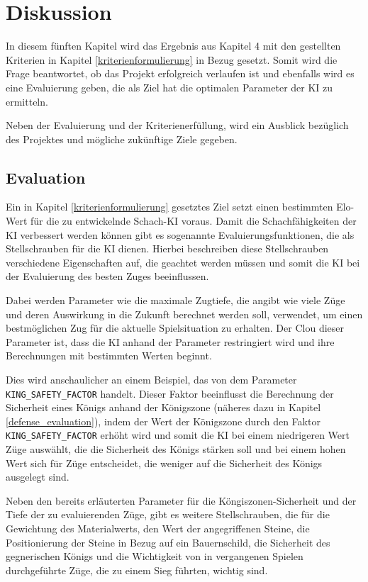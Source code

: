 \chapter{Diskussion}

In diesem fünften Kapitel wird das Ergebnis aus Kapitel 4 mit den gestellten Kriterien in Kapitel \ref{kriterienformulierung} in Bezug gesetzt. Somit wird die Frage beantwortet, ob das Projekt erfolgreich verlaufen ist und ebenfalls wird es eine Evaluierung geben, die als Ziel hat die optimalen Parameter der KI zu ermitteln.

Neben der Evaluierung und der Kriterienerfüllung, wird ein Ausblick bezüglich des Projektes und mögliche zukünftige Ziele gegeben.

\section{Evaluation}\label{evaluation}
Ein in Kapitel \ref{kriterienformulierung} gesetztes Ziel setzt einen bestimmten Elo-Wert für die zu entwickelnde Schach-KI voraus. Damit die Schachfähigkeiten der KI verbessert werden können gibt es sogenannte Evaluierungsfunktionen, die als Stellschrauben für die KI dienen. Hierbei beschreiben diese Stellschrauben verschiedene Eigenschaften auf, die geachtet werden müssen und somit die KI bei der Evaluierung des besten Zuges beeinflussen. 

Dabei werden Parameter wie die maximale Zugtiefe, die angibt wie viele Züge und deren Auswirkung in die Zukunft berechnet werden soll, verwendet, um einen bestmöglichen Zug für die aktuelle Spielsituation zu erhalten. Der Clou dieser Parameter ist, dass die KI anhand der Parameter restringiert wird und ihre Berechnungen mit bestimmten Werten beginnt.

Dies wird anschaulicher an einem Beispiel, das von dem Parameter \texttt{KING\_SAFETY\_FACTOR} handelt. Dieser Faktor beeinflusst die Berechnung der Sicherheit eines Königs anhand der Königszone (näheres dazu in Kapitel \ref{defense_evaluation}), indem der Wert der Königszone durch den Faktor \texttt{KING\_SAFETY\_FACTOR} erhöht wird und somit die KI bei einem niedrigeren Wert Züge auswählt, die die Sicherheit des Königs stärken soll und bei einem hohen Wert sich für Züge entscheidet, die weniger auf die Sicherheit des Königs ausgelegt sind.

Neben den bereits erläuterten Parameter für die Köngiszonen-Sicherheit und der Tiefe der zu evaluierenden Züge, gibt es weitere Stellschrauben, die für die Gewichtung des Materialwerts, den Wert der angegriffenen Steine, die Positionierung der Steine in Bezug auf ein Bauernschild, die Sicherheit des gegnerischen Königs und die Wichtigkeit von in vergangenen Spielen durchgeführte Züge, die zu einem Sieg führten, wichtig sind.

